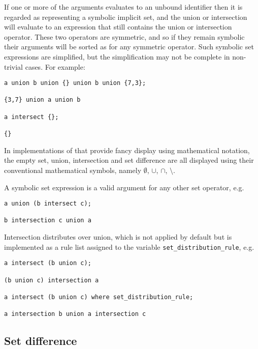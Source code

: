 If one or more of the arguments evaluates to an unbound identifier
then it is regarded as representing a symbolic implicit set, and the
union or intersection will evaluate to an expression that still
contains the union or intersection operator.  These two operators are
symmetric, and so if they remain symbolic their arguments will be
sorted as for any symmetric operator.  Such symbolic set expressions
are simplified, but the simplification may not be complete in
non-trivial cases.  For example:
\begin{verbatim}
a union b union {} union b union {7,3};

{3,7} union a union b

a intersect {};

{}
\end{verbatim}

In implementations of \REDUCE that provide fancy display using
mathematical notation, the empty set, union, intersection and set
difference are all displayed using their conventional mathematical
symbols, namely $\emptyset$, $\cup$, $\cap$, $\setminus$.

A symbolic set expression is a valid argument for any other set
operator, e.g.
\begin{verbatim}
a union (b intersect c);

b intersection c union a
\end{verbatim}

Intersection distributes over union, which is not applied by default
but is implemented as a rule list assigned to the variable
\texttt{set\_distribution\_rule}, e.g.
\hypertarget{reserved:SET_DISTRIBUTION_RULE}{}
\begin{verbatim}
a intersect (b union c);

(b union c) intersection a

a intersect (b union c) where set_distribution_rule;

a intersection b union a intersection c
\end{verbatim}


\subsection{Set difference}
\hypertarget{operator:SETDIFF}{}
\hypertarget{operator:setdiffop}{}

